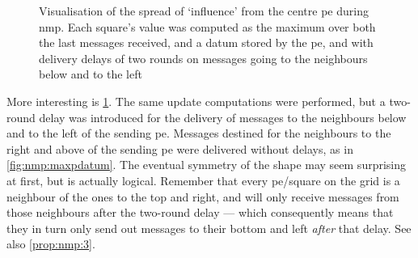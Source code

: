 \begin{figure}
    \caption[Visualisation of the spread of `influence' from the centre  during ]{Visualisation of the spread of `influence' from the centre \gls{pe} during \gls{nmp}.  Each square's value was computed as the maximum over both the last messages received, and a datum stored by the \gls{pe}, and with delivery delays of two rounds on messages going to the neighbours below and to the left}
    \label{fig:nmp:maxpdatumdelays}
\end{figure}

More interesting is \cref{fig:nmp:maxpdatumdelays}.  The same update computations were performed, but a two-round delay was introduced for the delivery of messages to the neighbours below and to the left of the sending \gls{pe}.  Messages destined for the neighbours to the right and above of the sending \gls{pe} were delivered without delays, as in \cref{fig:nmp:maxpdatum}.  The eventual symmetry of the shape may seem surprising at first, but is actually logical.  Remember that every \gls{pe}/square on the grid is a neighbour of the ones to the top and right, and will only receive messages from those neighbours after the two-round delay --- which consequently means that they in turn only send out messages to their bottom and left \emph{after} that delay.  See also \cref{prop:nmp:3}.

